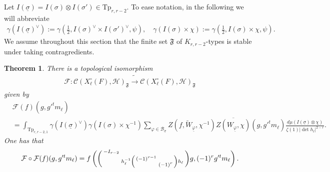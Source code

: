 \documentclass[12pt]{amsart}
\newtheorem{thm}{Theorem}[section]
\theoremstyle{remark}
\numberwithin{equation}{section}
\newcommand{\lto}{\longrightarrow}
\theoremstyle{definition}
\newenvironment{psmatrix}
  {\left(\begin{smallmatrix}}
  {\end{smallmatrix}\right)}
\numberwithin{equation}{subsection}
\begin{document}
Let $I(\underline{\sigma})=I(\sigma) \otimes I(\sigma') \in \mathrm{Tp}_{r,r-2}.$
To ease notation, in the following we will abbreviate
\begin{align} 
\gamma(I(\underline{\sigma})^\vee):=\gamma(\tfrac{1}{2},I(\sigma)^\vee \times I(\sigma')^\vee,\psi),\quad \gamma(I(\sigma) \times \chi):=\gamma\left( \tfrac{1}{2},I(\sigma) \times \chi,\psi\right).
\end{align}
We assume throughout this section that the finite set $\mathfrak{F}$ of $K_{r,r-2}$-types is stable under taking contragredients.

\begin{thm} \label{thm:FT}
There is a topological isomorphism
\begin{align*}
    \mathcal{F}: \mathcal{C}(X^\circ_{\ell}(F),\mathcal{H})_{\mathfrak{F}}\tilde{\lto}  \mathcal{C}(X^\circ_{\ell}(F),\mathcal{H})_{\mathfrak{F}}
\end{align*}
given by 
\begin{align*}
&\mathcal{F}(f)(g,g'^tm_{\ell})\\
    &=\int_{\mathrm{Tp}_{r,r-2,1}}\gamma( I(\underline{\sigma})^\vee )\gamma(
    I(\sigma) \times \chi^{-1})
    \sum_{\varphi \in \mathcal{B}_{\underline{\sigma}}}
Z(f,\widetilde{W}_{\underline{\varphi}},\chi^{-1})\overline{Z(W_{\underline{\varphi}},\chi)}(g,g'^tm_{\ell})\frac{d\mu(I(\underline{\sigma}) \otimes \chi)}{\zeta(1)|\det h_\ell|^{2-r}}.
\end{align*}
One has that
\begin{align*}
    \mathcal{F} \circ \mathcal{F}(f)(g,g'^tm_{\ell})=
f\left(\begin{psmatrix} -I_{r-2}& \\ & h_\ell^{-1} \begin{psmatrix} (-1)^{r-1} &\\ & (-1)^{r}\end{psmatrix} h_\ell  \end{psmatrix}g,(-1)^{r}g'^tm_{\ell}\right).
\end{align*}
\end{thm}
\end{document}

